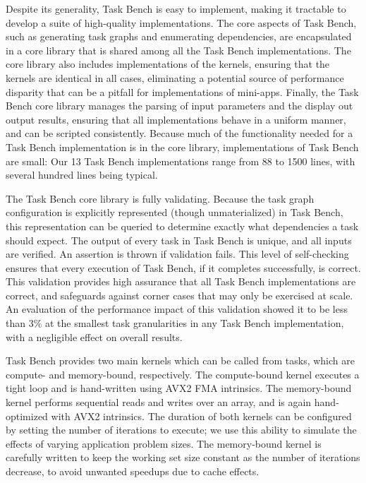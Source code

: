 


Despite its generality, Task Bench is easy to implement, making it
tractable to develop a suite of high-quality implementations. The core aspects of Task Bench, such as generating
task graphs and enumerating dependencies, are encapsulated in a core
library that is shared among all the Task Bench implementations. The
core library also includes implementations of the kernels, ensuring
that the kernels are identical in all cases, eliminating a potential
source of performance disparity that can be a pitfall for
implementations of mini-apps. Finally, the Task Bench core library manages the
parsing of input parameters and the display out output results,
ensuring that all implementations behave in a uniform manner, and can
be scripted consistently. Because much of the functionality needed for
a Task Bench implementation is in the core library, implementations of
Task Bench are small: Our 13 Task Bench implementations range from 88
to 1500 lines, with several hundred lines being typical.

The Task Bench core library is fully
validating. Because the task graph configuration is explicitly
represented (though unmaterialized) in Task Bench, this representation
can be queried to determine exactly what dependencies a task should
expect. The output of every task in Task Bench is unique,
and all inputs are verified. An assertion is thrown if validation
fails. This level of self-checking ensures that every execution of Task Bench, if it
completes successfully, is correct. This validation provides high
assurance that all Task Bench implementations are correct, and
safeguards against corner cases that may only be exercised at
scale. An evaluation of the performance impact of
this validation showed it to be less than 3\% at the smallest task
granularities in any Task Bench implementation, with a negligible
effect on overall results.

Task Bench provides two main kernels which can be called from tasks,
which are compute- and memory-bound, respectively. The compute-bound
kernel executes a tight loop and is hand-written using AVX2 FMA
intrinsics. The memory-bound kernel performs sequential reads and
writes over an array, and is again hand-optimized with AVX2
intrinsics. The duration of both kernels can be configured by setting
the number of iterations to execute; we use this ability to simulate
the effects of varying application problem sizes. The memory-bound
kernel is carefully written to keep the working set size constant as
the number of iterations decrease, to avoid unwanted speedups due to
cache effects.
